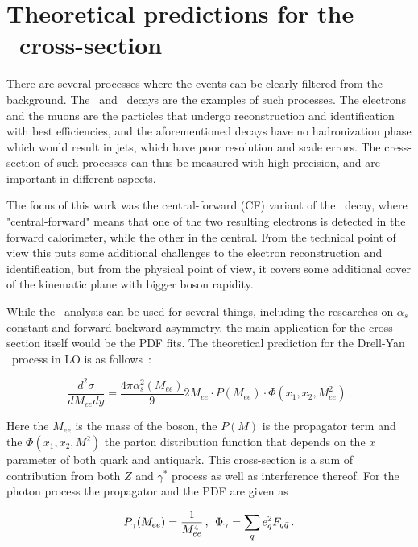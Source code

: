 \section{Theoretical predictions for the \Zee\ cross-section}

There are several processes where the events can be clearly filtered from the background. The \Wenu\ and \Zee\ decays are the examples of such processes. The electrons and the muons are the particles that undergo reconstruction and identification with best efficiencies, and the aforementioned decays have no hadronization phase which would result in jets, which have poor resolution and scale errors. The cress-section of such processes can thus be measured with high precision, and are important in different aspects.

The focus of this work was the central-forward (CF) variant of the \Zee\ decay, where "central-forward" means that one of the two resulting electrons is detected in the forward calorimeter, while the other in the central. From the technical point of view this puts some additional challenges to the electron reconstruction and identification, but from the physical point of view, it covers some additional cover of the kinematic plane with bigger boson rapidity.

While the \Zee\ analysis can be used for several things, including the researches on $\alpha_{s}$ constant and forward-backward asymmetry, the main application for the cross-section itself would be the PDF fits. The theoretical prediction for the Drell-Yan \Zgee\ process in LO is as follows~\cite{lib:theory_Z-c-s}:

\begin{equation}
\frac{d^{2}\sigma}{dM_{ee}dy} = \frac{4\pi\alpha^{2}_{s}(M_{ee})}{9}2M_{ee}\cdot P(M_{ee})\cdot\Phi(x_{1},x_{2},M^{2}_{ee})\,.
\end{equation}

Here the $M_{ee}$ is the mass of the boson, the $P(M)$ is the propagator term and the $\Phi(x_{1},x_{2},M^{2})$ the parton distribution function that depends on the $x$ parameter of both quark and antiquark. This cross-section is a sum of contribution from both $Z$ and $\gamma^*$ process as well as interference thereof. For the photon process the propagator and the PDF are given as

\begin{equation}
P_{\gamma}(M_{ee}) = \frac{1}{M^{4}_{ee}}\,,\,\;\Phi_{\gamma} = \sum_{q} e^{2}_{q} F_{q\bar{q}} \,.
\end{equation}

